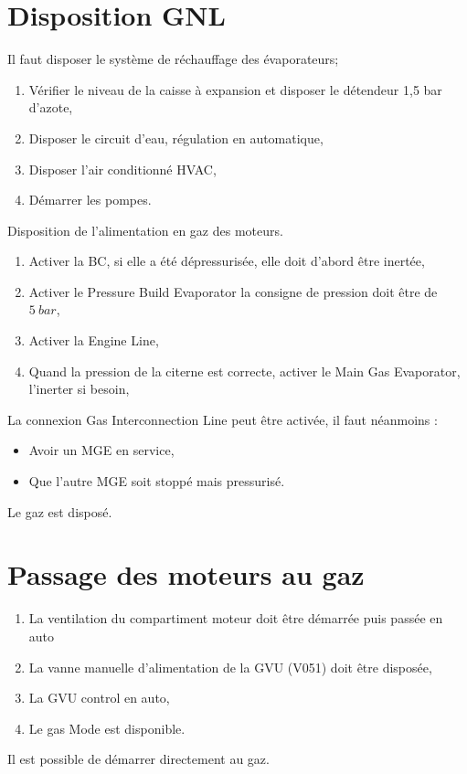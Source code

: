 \documentclass[12pt,a4paper]{article}
\begin{document}
\section*{Disposition GNL}

Il faut disposer le système de réchauffage des évaporateurs;
\begin{enumerate}
 \item Vérifier le niveau de la caisse à expansion et disposer le détendeur 1,5 bar d'azote,
 \item Disposer le circuit d'eau, régulation en automatique,
 \item Disposer l'air conditionné HVAC,
 \item Démarrer les pompes.
\end{enumerate}
Disposition de l'alimentation en gaz des moteurs.
\begin{enumerate}[resume]
 \item Activer la BC, si elle a été dépressurisée, elle doit d'abord être inertée,
 \item Activer le Pressure Build Evaporator la consigne de pression doit être de $5~bar$,
 \item Activer la Engine Line,
 \item Quand la pression de la citerne est correcte, activer le Main Gas Evaporator, l'inerter si besoin,
 \end{enumerate}
La connexion Gas Interconnection Line peut être activée, il faut néanmoins :
\begin{itemize}
 \item Avoir un MGE en service,
 \item Que l'autre MGE soit stoppé mais pressurisé.
\end{itemize}
Le gaz est disposé.
\section*{Passage des moteurs au gaz}
\begin{enumerate}
 \item La ventilation du compartiment moteur doit être démarrée puis passée en auto 
 \item La vanne manuelle d'alimentation de la GVU (V051) doit être disposée,
 \item La GVU control en auto,
 \item Le gas Mode est disponible.
\end{enumerate}
Il est possible de démarrer directement au gaz.
\end{document}

